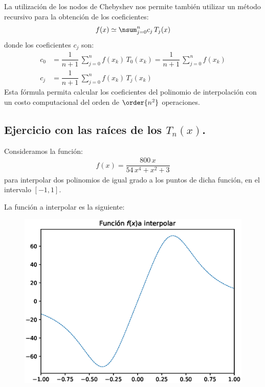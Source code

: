 La utilización de los nodos de Chebyshev nos permite también utilizar un método recursivo para la obtención de los coeficientes:
\begin{align*}
f(x) \simeq \nsum_{j=0}^{n} c_{j} \, T_{j}(x)
\end{align*}
donde los coeficientes $c_{j}$ son:
\begin{align*}
c_{0} &= \dfrac{1}{n + 1} \, \sum_{j=0}^{n} f(x_{k}) \, T_{0}(x_{k}) = \dfrac{1}{n + 1} \, \sum_{j=0}^{n} f(x_{k}) \\[0.5em]
c_{j} &= \dfrac{1}{n + 1} \, \sum_{j=0}^{n} f(x_{k}) \, T_{j}(x_{k})
\end{align*}
Esta fórmula permita calcular los coeficientes del polinomio de interpolación con un costo computacional del orden de $\order{n^{2}}$ operaciones.

\subsection{Ejercicio con las raíces de los \texorpdfstring{$T_{n}(x)$}{Tn(x)}.}

Consideramos la función:
\begin{align*}
f(x) = \dfrac{800 \, x}{54 \, x^{4} + x^{2} + 3}
\end{align*}
para interpolar dos polinomios de igual grado a los puntos de dicha función, en el intervalo $[-1, 1]$.
\par
La función a interpolar es la siguiente:
\begin{figure}[H]
    \centering
    \includegraphics[scale=0.75]{Imagenes/Plot_Ejercicio_Chebychev_01.eps}
\end{figure}

